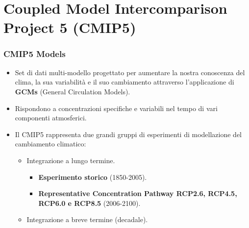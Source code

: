 \section{Coupled Model Intercomparison Project 5 (CMIP5)}

\begin{frame} \frametitle{CMIP5 Models} { \fontsize{13pt}{14}\selectfont	

\begin{itemize} \setlength\itemsep{10pt}

    \item<1-> Set di dati multi-modello progettato per aumentare la nostra conoscenza del clima, la sua variabilità e il suo cambiamento attraverso l'applicazione di \textbf{GCMs} (General Circulation Models).
    \item<2-> Rispondono a concentrazioni specifiche e variabili nel tempo di vari componenti atmosferici.
	\item<3-> Il CMIP5 rappresenta due grandi gruppi di esperimenti di modellazione del cambiamento climatico:
	\begin{itemize}
        \item<4-> {\fontsize{12pt}{14}\selectfont Integrazione a lungo termine.}
	       \begin{itemize}
	           \item<5-> \textbf{Esperimento storico} (1850-2005).
	           \item<5-> \textbf{Representative Concentration Pathway  RCP2.6, RCP4.5, RCP6.0 e RCP8.5} (2006-2100).
	       \end{itemize}
	    \item<4-> {\fontsize{12pt}{14}\selectfont Integrazione a breve termine (decadale).}
	\end{itemize}  
\end{itemize}
	
}	
\end{frame}



